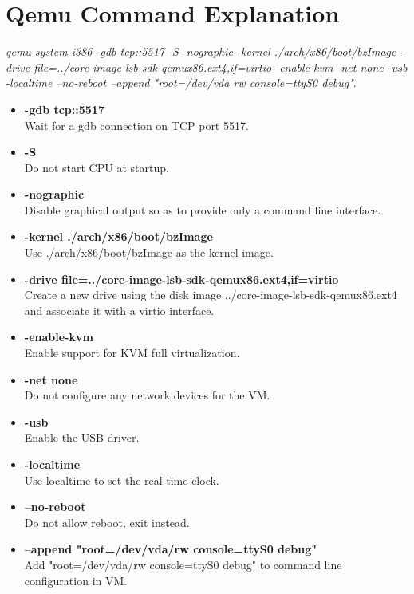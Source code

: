 \documentclass[onecolumn,draftclsnofoot, 10pt, compsoc]{IEEEtran}
\begin{document}
\section{Qemu Command Explanation}
	\textit{qemu-system-i386 -gdb tcp::5517 -S -nographic -kernel ./arch/x86/boot/bzImage -drive file=../core-image-lsb-sdk-qemux86.ext4,if=virtio -enable-kvm -net none -usb -localtime --no-reboot --append "root=/dev/vda rw console=ttyS0 debug"}. 
	\begin{itemize}
		\item \textbf{-gdb tcp::5517} \\
		Wait for a gdb connection on TCP port 5517.
		\item \textbf{-S} \\
		Do not start CPU at startup.	
		\item \textbf{-nographic} \\
		Disable graphical output so as to provide only a command line interface.
		\item \textbf{-kernel ./arch/x86/boot/bzImage} \\
		Use ./arch/x86/boot/bzImage as the kernel image.	
		\item \textbf{-drive file=../core-image-lsb-sdk-qemux86.ext4,if=virtio} \\
		Create a new drive using the disk image ../core-image-lsb-sdk-qemux86.ext4 and associate it with a virtio interface.
		\item \textbf{-enable-kvm} \\
		Enable support for KVM full virtualization.
		\item \textbf{-net none} \\
		Do not configure any network devices for the VM.
		\item \textbf{-usb} \\
		Enable the USB driver.	
		\item \textbf{-localtime} \\
		Use localtime to set the real-time clock.
		\item \textbf{--no-reboot} \\ 
		Do not allow reboot, exit instead.
		\item \textbf{--append "root=/dev/vda/rw console=ttyS0 debug"} \\
		Add "root=/dev/vda/rw console=ttyS0 debug" to command line configuration in VM.
	\end{itemize}
\end{document}
